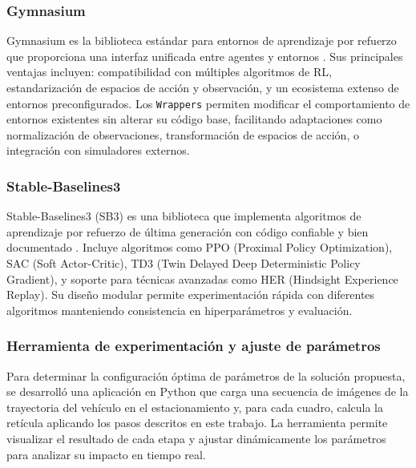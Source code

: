 \subsubsection{Gymnasium}\label{sec:gymnasium}
\noindent
Gymnasium es la biblioteca estándar para entornos de aprendizaje por refuerzo que proporciona una interfaz
unificada entre agentes y entornos \cite{towers2024gymnasium}. Sus principales ventajas incluyen:
compatibilidad con múltiples algoritmos de RL, estandarización de espacios de acción y observación,
y un ecosistema extenso de entornos preconfigurados. Los \texttt{Wrappers} permiten modificar el comportamiento
de entornos existentes sin alterar su código base, facilitando adaptaciones como normalización de observaciones,
transformación de espacios de acción, o integración con simuladores externos.

\subsubsection{Stable-Baselines3}\label{sec:stable-baselines3}
\noindent
Stable-Baselines3 (SB3) es una biblioteca que implementa algoritmos de aprendizaje por refuerzo de última
generación con código confiable y bien documentado \cite{raffin2021stable}. Incluye algoritmos como
PPO (Proximal Policy Optimization), SAC (Soft Actor-Critic), TD3 (Twin Delayed Deep Deterministic Policy Gradient),
y soporte para técnicas avanzadas como HER (Hindsight Experience Replay). Su diseño modular permite
experimentación rápida con diferentes algoritmos manteniendo consistencia en hiperparámetros y evaluación.

\subsubsection{Herramienta de experimentación y ajuste de parámetros}\label{sec:experimentation-tool}
\noindent
Para determinar la configuración óptima de parámetros de la solución propuesta, se desarrolló una aplicación en Python
que carga una secuencia de imágenes de la trayectoria del vehículo en el estacionamiento y, para cada cuadro,
calcula la retícula aplicando los pasos descritos en este trabajo. La herramienta permite visualizar el resultado de cada
etapa y ajustar dinámicamente los parámetros para analizar su impacto en tiempo real.

